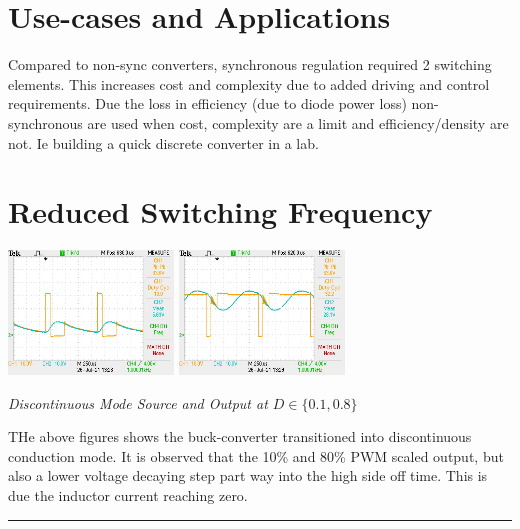 \documentclass[11pt]{article}
\begin{document}
\begin{preview}
\begin{center}
    \end{center}
    \section{Use-cases and Applications}

    Compared to non-sync converters, synchronous regulation required 2 switching elements. This increases cost and complexity due to added driving and control requirements. Due the loss in efficiency (due to diode power loss) non-synchronous are used when cost, complexity are a limit and efficiency/density are not. Ie building a quick discrete converter in a lab.

    \section{Reduced Switching Frequency}
    \begin{center}
        \includegraphics[width=0.33\textwidth]{img/D10_1K.JPG}
        \includegraphics[width=0.33\textwidth]{img/D80_1K.JPG}

        \textit{Discontinuous Mode Source and Output at $D \in \{0.1, 0.8\}$}
    \end{center}

    THe above figures shows the buck-converter transitioned into discontinuous conduction mode. It is observed that the 10\% and 80\% PWM scaled output, but also a lower voltage decaying step part way into the high side off time. This is due the inductor current reaching zero.

    \hrule
\end{preview}
\end{document}
